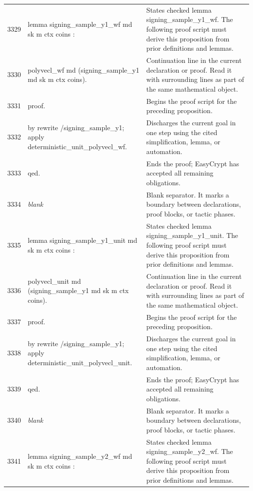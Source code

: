 \documentclass[10pt]{article}
\begin{document}
\begin{longtable}{r L{0.53\textwidth} L{0.37\textwidth}}
3329 & {\ttfamily\scriptsize lemma signing\_sample\_y1\_wf md sk m ctx coins :} & States checked lemma signing\_sample\_y1\_wf.  The following proof script must derive this proposition from prior definitions and lemmas. \\
3330 & {\ttfamily\scriptsize   polyvecl\_wf md (signing\_sample\_y1 md sk m ctx coins).} & Continuation line in the current declaration or proof.  Read it with surrounding lines as part of the same mathematical object. \\
3331 & {\ttfamily\scriptsize proof.} & Begins the proof script for the preceding proposition. \\
3332 & {\ttfamily\scriptsize by rewrite /signing\_sample\_y1; apply deterministic\_unit\_polyvecl\_wf.} & Discharges the current goal in one step using the cited simplification, lemma, or automation. \\
3333 & {\ttfamily\scriptsize qed.} & Ends the proof; EasyCrypt has accepted all remaining obligations. \\
3334 & {\ttfamily\scriptsize \emph{blank}} & Blank separator.  It marks a boundary between declarations, proof blocks, or tactic phases. \\
3335 & {\ttfamily\scriptsize lemma signing\_sample\_y1\_unit md sk m ctx coins :} & States checked lemma signing\_sample\_y1\_unit.  The following proof script must derive this proposition from prior definitions and lemmas. \\
3336 & {\ttfamily\scriptsize   polyvecl\_unit md (signing\_sample\_y1 md sk m ctx coins).} & Continuation line in the current declaration or proof.  Read it with surrounding lines as part of the same mathematical object. \\
3337 & {\ttfamily\scriptsize proof.} & Begins the proof script for the preceding proposition. \\
3338 & {\ttfamily\scriptsize by rewrite /signing\_sample\_y1; apply deterministic\_unit\_polyvecl\_unit.} & Discharges the current goal in one step using the cited simplification, lemma, or automation. \\
3339 & {\ttfamily\scriptsize qed.} & Ends the proof; EasyCrypt has accepted all remaining obligations. \\
3340 & {\ttfamily\scriptsize \emph{blank}} & Blank separator.  It marks a boundary between declarations, proof blocks, or tactic phases. \\
3341 & {\ttfamily\scriptsize lemma signing\_sample\_y2\_wf md sk m ctx coins :} & States checked lemma signing\_sample\_y2\_wf.  The following proof script must derive this proposition from prior definitions and lemmas. \\

\end{longtable}
\end{document}
